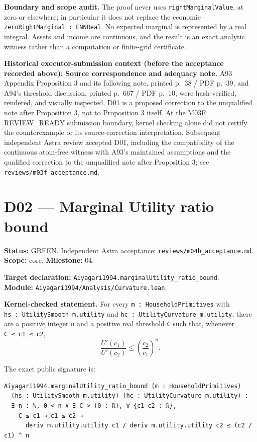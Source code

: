 \documentclass[
  11pt,
]{article}
\let\LedgerOriginalTexttt\texttt
\renewcommand{\texttt}[1]{{\small\LedgerOriginalTexttt{#1}}}
\begin{document}
\textbf{Boundary and scope audit.} The proof never uses
\texttt{rightMarginalValue}, at zero or elsewhere; in particular it does
not replace the economic \texttt{zeroRightMarginal\ :\ ENNReal}. No
expected marginal is represented by a real integral. Assets and income
are continuous, and the result is an exact analytic witness rather than
a computation or finite-grid certificate.

\textbf{Historical executor-submission context (before the acceptance
recorded above):} \textbf{Source correspondence and adequacy note.} A93
Appendix Proposition 3 and its following note, printed p.~38 / PDF
p.~39, and A94's threshold discussion, printed p.~667 / PDF p.~10, were
hash-verified, rendered, and visually inspected. D01 is a proposed
correction to the unqualified note after Proposition 3, not to
Proposition 3 itself. At the M03F REVIEW\_READY submission boundary,
kernel checking alone did not certify the counterexample or its
source-correction interpretation. Subsequent independent Astra review
accepted D01, including the compatibility of the continuous atom-free
witness with A93's maintained assumptions and the qualified correction
to the unqualified note after Proposition 3; see
\texttt{reviews/m03f\_acceptance.md}.

\section{D02 --- Marginal Utility ratio
bound}\label{d02-marginal-utility-ratio-bound}

\textbf{Status:} GREEN. Independent Astra acceptance:
\texttt{reviews/m04b\_acceptance.md}. \textbf{Scope:} core.
\textbf{Milestone:} 04.

\textbf{Target declaration:}
\texttt{Aiyagari1994.marginalUtility\_ratio\_bound}.\\
\textbf{Module:} \texttt{Aiyagari1994/Analysis/Curvature.lean}.

\textbf{Kernel-checked statement.} For every
\texttt{m\ :\ HouseholdPrimitives} with
\texttt{hs\ :\ UtilitySmooth\ m.utility} and
\texttt{hc\ :\ UtilityCurvature\ m.utility}, there are a positive
integer \texttt{n} and a positive real threshold \texttt{C} such that,
whenever \texttt{C\ ≤\ c1\ ≤\ c2}, \[
  \frac{U'(c_1)}{U'(c_2)}\leq\left(\frac{c_2}{c_1}\right)^n.
\]

The exact public signature is:

\begin{verbatim}
Aiyagari1994.marginalUtility_ratio_bound (m : HouseholdPrimitives)
  (hs : UtilitySmooth m.utility) (hc : UtilityCurvature m.utility) :
  ∃ n : ℕ, 0 < n ∧ ∃ C > (0 : ℝ), ∀ {c1 c2 : ℝ},
    C ≤ c1 → c1 ≤ c2 →
      deriv m.utility.utility c1 / deriv m.utility.utility c2 ≤ (c2 / c1) ^ n
\end{verbatim}
\end{document}
